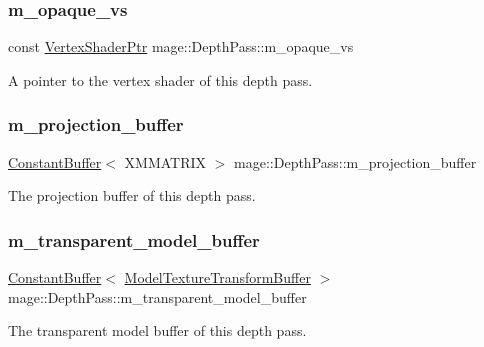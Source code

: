 \subsubsection{\texorpdfstring{m\+\_\+opaque\+\_\+vs}{m\_opaque\_vs}}
{\footnotesize\ttfamily const \hyperlink{namespacemage_a1f19b094f771e30bc0a6c1cebcc0dd58}{Vertex\+Shader\+Ptr} mage\+::\+Depth\+Pass\+::m\+\_\+opaque\+\_\+vs\hspace{0.3cm}{\ttfamily [private]}}

A pointer to the vertex shader of this depth pass. \hypertarget{classmage_1_1_depth_pass_a4c9833ceaf223b73404edab4cf81b7c1}{}\label{classmage_1_1_depth_pass_a4c9833ceaf223b73404edab4cf81b7c1} 
\subsubsection{\texorpdfstring{m\+\_\+projection\+\_\+buffer}{m\_projection\_buffer}}
{\footnotesize\ttfamily \hyperlink{classmage_1_1_constant_buffer}{Constant\+Buffer}$<$ X\+M\+M\+A\+T\+R\+IX $>$ mage\+::\+Depth\+Pass\+::m\+\_\+projection\+\_\+buffer\hspace{0.3cm}{\ttfamily [private]}}

The projection buffer of this depth pass. \hypertarget{classmage_1_1_depth_pass_a4b6a38c56e02b6185c1eef8bcaaa5786}{}\label{classmage_1_1_depth_pass_a4b6a38c56e02b6185c1eef8bcaaa5786} 
\subsubsection{\texorpdfstring{m\+\_\+transparent\+\_\+model\+\_\+buffer}{m\_transparent\_model\_buffer}}
{\footnotesize\ttfamily \hyperlink{classmage_1_1_constant_buffer}{Constant\+Buffer}$<$ \hyperlink{structmage_1_1_model_texture_transform_buffer}{Model\+Texture\+Transform\+Buffer} $>$ mage\+::\+Depth\+Pass\+::m\+\_\+transparent\+\_\+model\+\_\+buffer\hspace{0.3cm}{\ttfamily [private]}}

The transparent model buffer of this depth pass. \hypertarget{classmage_1_1_depth_pass_a8775d8a4a49dc60ad9d343d3895cb714}{}\label{classmage_1_1_depth_pass_a8775d8a4a49dc60ad9d343d3895cb714} 
